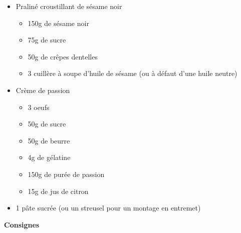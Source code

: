 \documentclass[]{book}
\providecommand{\tightlist}{%
  \setlength{\itemsep}{0pt}\setlength{\parskip}{0pt}}
\begin{document}
\begin{itemize}
\tightlist
\item
  Praliné croustillant de sésame noir

  \begin{itemize}
  \tightlist
  \item
    150g de sésame noir
  \item
    75g de sucre
  \item
    50g de crêpes dentelles
  \item
    3 cuillère à soupe d'huile de sésame (ou à défaut d'une huile
    neutre)
  \end{itemize}
\item
  Crème de passion

  \begin{itemize}
  \tightlist
  \item
    3 oeufs
  \item
    50g de sucre
  \item
    50g de beurre
  \item
    4g de gélatine
  \item
    150g de purée de passion
  \item
    15g de jus de citron
  \end{itemize}
\item
  1 pâte sucrée (ou un streusel pour un montage en entremet)
\end{itemize}

\textbf{Consignes}
\end{document}
